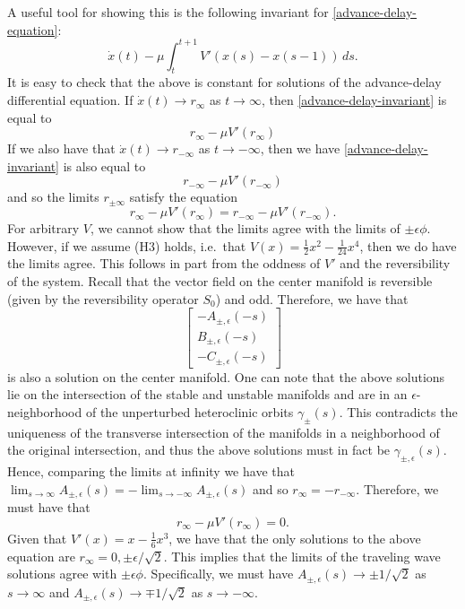 A useful tool for showing this is the following invariant for \cref{advance-delay-equation}:
\begin{equation}\label{advance-delay-invariant}
	\dot x(t) - \mu \int_t^{t+1} V'(x(s) - x(s-1)) \, ds.
\end{equation}
It is easy to check that the above is constant for solutions of the advance-delay differential equation. If \(\dot x(t) \to r_\infty\) as \(t\to \infty\), then \cref{advance-delay-invariant} is equal to 
\begin{equation*}
	r_\infty - \mu V'(r_\infty)
\end{equation*}
If we also have that \(\dot x(t) \to r_{-\infty}\) as \(t\to-\infty\), then we have \cref{advance-delay-invariant} is also equal to 
\begin{equation*}
	r_{-\infty} - \mu V'(r_{-\infty}) 
\end{equation*}
and so the limits \(r_{\pm \infty}\) satisfy the equation
\begin{equation*}
	r_\infty - \mu V'(r_\infty) = r_{-\infty} - \mu V'(r_{-\infty}) .
\end{equation*}
For arbitrary \(V\), we cannot show that the limits agree with the limits of \(\pm\epsilon \phi \). However, if we assume (H3) holds, i.e.\ that \(V(x) = \frac 1 2 x^2 - \frac 1 {24} x^4\), then we do have the limits agree. This follows in part from the oddness of \(V'\) and the reversibility of the system. Recall that the vector field on the center manifold is reversible (given by the reversibility operator \(S_0\)) and odd. Therefore, we have that
\begin{equation*}
	\begin{bmatrix}
		- A_{\pm, \epsilon} (-s) \\
		B_{\pm, \epsilon} (-s) \\
		-C_{\pm, \epsilon} (-s)
	\end{bmatrix}
\end{equation*}
is also a solution on the center manifold. One can note that the above solutions lie on the intersection of the stable and unstable manifolds and are in an \(\epsilon\)-neighborhood of the unperturbed heteroclinic orbits \(\gamma_{\pm}(s)\). This contradicts the uniqueness of the transverse intersection of the manifolds in a neighborhood of the original intersection, and thus the above solutions must in fact be \(\gamma_{\pm,\epsilon}(s)\). Hence, comparing the limits at infinity we have that \(\lim_{s\to\infty} A_{\pm,\epsilon} (s) = -\lim_{s\to-\infty} A_{\pm, \epsilon}(s)\) and so \(r_\infty = - r_{-\infty}\). Therefore, we must have that 
\begin{equation*}
	r_\infty - \mu V'(r_\infty) = 0.
\end{equation*}
Given that \(V'(x) = x - \frac 1 6 x^3\), we have that the only solutions to the above equation are \(r_{\infty} = 0, \pm \epsilon / \sqrt 2\). This implies that the limits of the traveling wave solutions agree with \(\pm \epsilon \phi\). Specifically, we must have \(A_{\pm, \epsilon}(s) \to \pm 1 / \sqrt 2\) as \(s\to \infty\) and \(A_{\pm, \epsilon}(s) \to \mp 1 / \sqrt 2\) as \(s\to -\infty\).

